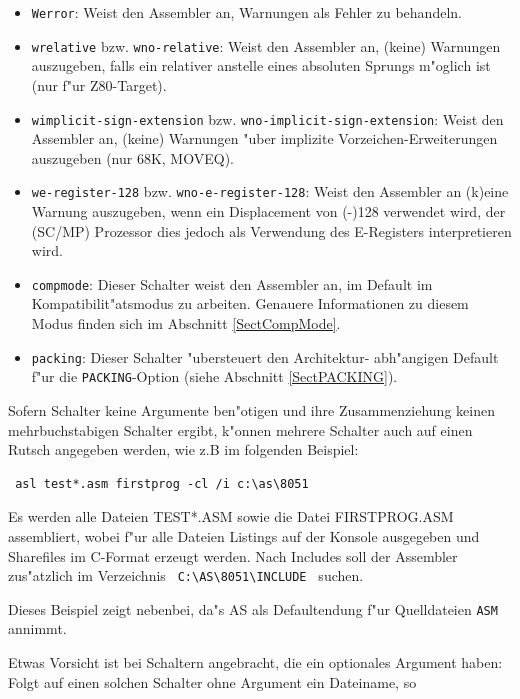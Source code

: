 \documentclass[12pt,a4paper,twoside]{report}
\newcommand{\tty}[1]{{\tt #1}}
\newcommand{\asname}{AS}
\begin{document}
\begin{itemize}
{      Vorw"artsreferenzen erlaubt sind.  Eine Umstellung auf einen
      Wert gr"o"ser als den Vorgabewert (1) kann in Sonderf"allen, wie
      bei verketteten Vorw"artsreferenzen erforderlich sein.}
\item{{\tt Werror}: Weist den Assembler an, Warnungen als Fehler zu
      behandeln.}
\item{{\tt wrelative} bzw. {\tt wno-relative}: Weist den Assembler an,
      (keine) Warnungen auszugeben, falls ein relativer anstelle eines absoluten
      Sprungs m"oglich ist (nur f"ur Z80-Target).}
\item{{\tt wimplicit-sign-extension} bzw. {\tt wno-implicit-sign-extension}: Weist den
      Assembler an, (keine) Warnungen "uber implizite Vorzeichen-Erweiterungen
      auszugeben (nur 68K, MOVEQ).}
\item{{\tt we-register-128} bzw. {\tt wno-e-register-128}: Weist den Assembler an
      (k)eine Warnung auszugeben, wenn ein Displacement von (-)128 verwendet wird, der
      (SC/MP) Prozessor dies jedoch als Verwendung des E-Registers interpretieren wird.}
\item{\tty{compmode}: Dieser Schalter weist den Assembler an, im Default
      im Kompatibilit"atsmodus zu arbeiten.  Genauere Informationen zu
      diesem Modus finden sich im Abschnitt \ref{SectCompMode}.}
\item{\tty{packing}: Dieser Schalter "ubersteuert den Architektur-
      abh"angigen Default f"ur die {\tt PACKING}-Option (siehe
      Abschnitt \ref{SectPACKING}).}
\end{itemize}
Sofern Schalter keine Argumente ben"otigen und ihre Zusammenziehung
keinen mehrbuchstabigen Schalter ergibt, k"onnen mehrere Schalter
auch auf einen Rutsch angegeben werden, wie z.B im folgenden Beispiel:
\begin{verbatim}
 asl test*.asm firstprog -cl /i c:\as\8051
\end{verbatim}
Es werden alle Dateien TEST*.ASM sowie die Datei FIRSTPROG.ASM
assembliert, wobei f"ur alle Dateien Listings auf der Konsole
ausgegeben und Sharefiles im C-Format erzeugt werden.  Nach Includes
soll der Assembler zus"atzlich im Verzeichnis \verb! C:\AS\8051\INCLUDE !
suchen.
\par
Dieses Beispiel zeigt nebenbei, da"s \asname{} als Defaultendung f"ur Quelldateien
\tty{ASM} annimmt.
\par
Etwas Vorsicht ist bei Schaltern angebracht, die ein optionales Argument
haben: Folgt auf einen solchen Schalter ohne Argument ein Dateiname, so
\end{document}
